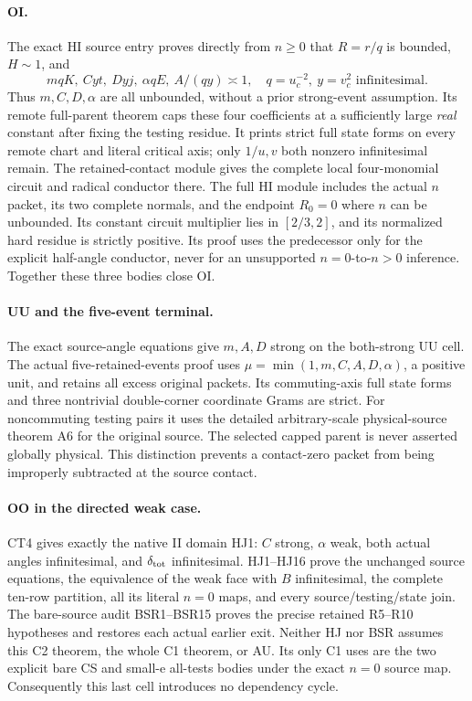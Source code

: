 \paragraph{OI.}
The exact HI source entry proves directly from \(n\geq0\)
that \(R=r/q\) is bounded, \(H\sim1\), and
\[
 mqK,\ Cyt,\ Dyj,\ \alpha qE,\ A/(qy)\asymp1,
 \quad q=u_c^{-2},\ y=v_c^2\text{ infinitesimal}.       \tag{CT15}
\]
Thus \(m,C,D,\alpha\) are all unbounded, without a prior
strong-event assumption.  Its remote full-parent theorem
caps these four coefficients at a sufficiently large
\emph{real} constant after fixing the testing residue.
It prints strict full state forms on every remote chart
and literal critical axis; only \(1/u,v\) both nonzero
infinitesimal remain.
The retained-contact module gives the complete local
four-monomial circuit and radical conductor there.
The full HI module includes the actual \(n\) packet, its
two complete normals, and the endpoint \(R_0=0\) where
\(n\) can be unbounded.  Its constant circuit multiplier
lies in \([2/3,2]\), and its normalized hard residue
is strictly positive.  Its proof uses the predecessor
only for the explicit half-angle conductor, never for
an unsupported \(n=0\)-to-\(n>0\) inference.
Together these three bodies close OI.

\paragraph{UU and the five-event terminal.}
The exact source-angle equations give \(m,A,D\) strong on
the both-strong UU cell.  The actual five-retained-events
proof uses \(\mu=\min(1,m,C,A,D,\alpha)\), a positive unit,
and retains all excess original packets.
Its commuting-axis full state forms and three nontrivial
double-corner coordinate Grams are strict.  For
noncommuting testing pairs it uses the detailed arbitrary-scale
physical-source theorem A6 for the original source.
The selected capped parent is never asserted globally
physical.  This distinction prevents a contact-zero
packet from being improperly subtracted at the source
contact.

\paragraph{OO in the directed weak case.}
CT4 gives exactly the native II domain HJ1:
\(C\) strong, \(\alpha\) weak, both actual angles
infinitesimal, and \(\delta_{\rm tot}\) infinitesimal.
HJ1--HJ16 prove the unchanged source equations, the
equivalence of the weak face with \(B\) infinitesimal,
the complete ten-row partition, all its literal \(n=0\)
maps, and every source/testing/state join.
The bare-source audit BSR1--BSR15 proves the precise
retained R5--R10 hypotheses and restores each actual
earlier exit.  Neither HJ nor BSR assumes this C2 theorem,
the whole C1 theorem, or AU.  Its only C1 uses are the
two explicit bare CS and small-e all-tests bodies under
the exact \(n=0\) source map.
Consequently this last cell introduces no dependency cycle.

